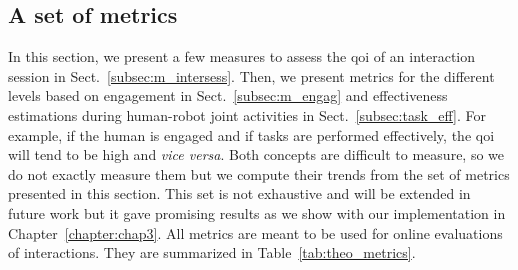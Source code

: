 \documentclass[a4paper,11pt,twoside]{StyleThese}
\begin{document}
\subsection{A set of metrics}\label{sec:metrics}

In this section, we present a few measures to assess the \acrshort{qoi} of an interaction session in Sect.~\ref{subsec:m_intersess}. Then, we present metrics for the different levels based on engagement in Sect.~\ref{subsec:m_engag} and effectiveness estimations during human-robot joint activities in Sect.~\ref{subsec:task_eff}. For example, if the human is engaged and if tasks are performed effectively, the \acrshort{qoi} will tend to be high and \textit{vice versa}. Both concepts are difficult to measure, so we do not exactly measure them but we compute their trends from the set of metrics presented in this section. This set is not exhaustive and will be extended in future work but it gave promising results as we show with our implementation in Chapter~\ref{chapter:chap3}. All metrics are meant to be used for online evaluations of interactions. They are summarized in Table~\ref{tab:theo_metrics}.
\end{document}
